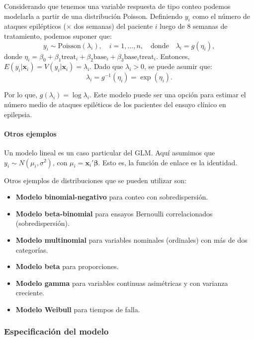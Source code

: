 \documentclass[
]{article}
\providecommand{\tightlist}{%
  \setlength{\itemsep}{0pt}\setlength{\parskip}{0pt}}
\begin{document}
Considerando que tenemos una variable respuesta de tipo conteo podemos modelarla a partir de una distribución Poisson. Definiendo \(y_i\) como el número de ataques epilépticos (\(\times\) dos semanas) del paciente \(i\) luego de 8 semanas de tratamiento, podemos suponer que:
\[
y_{i}\sim \mbox{Poisson}(\lambda_{i}), \quad i=1,...,n,\quad \text{donde} \quad \lambda_{i}=g(\eta_i),
\]
donde \(\eta_i = \beta_{0}+\beta_{1}\text{treat}_{i}+\beta_{2}\text{base}_{i}+\beta_{3}\text{base}_{i}\text{treat}_{i}.\) Entonces, \(E(y_{i}|\boldsymbol x_{i})=V(y_{i}|\boldsymbol x_{i})=\lambda_{i}\). Dado que \(\lambda_ i > 0\), se puede asumir que:
\[
\lambda_{i}=g^{-1}(\eta_i)=\exp(\eta_i).
\]

Por lo que, \(g(\lambda_{i})=\log\lambda_{i}\). Este modelo puede ser una opción para estimar el número medio de ataques epiléticos de los pacientes del ensayo clínico en epilepsia.

\paragraph*{Otros ejemplos}\label{otros-ejemplos}

Un modelo lineal es un caso particular del GLM. Aquí asumimos que \(y_i \sim N(\mu_i, \sigma^2)\), con \(\mu_i = \boldsymbol x_i'\boldsymbol \beta\). Esto es, la función de enlace es la identidad.

Otros ejemplos de distribuciones que se pueden utilizar son:

\begin{itemize}
\tightlist
\item
  \textbf{Modelo binomial-negativo} para conteo con sobredispersión.
\item
  \textbf{Modelo beta-binomial} para ensayos Bernoulli correlacionados (sobredispersión).
\item
  \textbf{Modelo multinomial} para variables nominales (ordinales) con más de dos categorías.
\item
  \textbf{Modelo beta} para proporciones.
\item
  \textbf{Modelo gamma} para variables continuas asimétricas y con varianza creciente.
\item
  \textbf{Modelo Weibull} para tiempos de falla.
\end{itemize}

\subsubsection{Especificación del modelo}\label{especificaciuxf3n-del-modelo}
\end{document}
